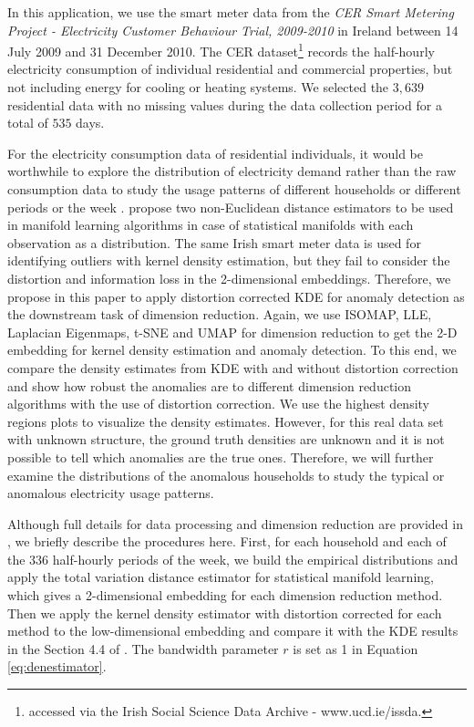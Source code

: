 \documentclass[11pt,a4paper,]{article}
\begin{document}
In this application, we use the smart meter data from the \emph{CER Smart Metering Project - Electricity Customer Behaviour Trial, 2009-2010} in Ireland \autocite{cer2012-data} between 14 July 2009 and 31 December 2010. The CER dataset\footnote{accessed via the Irish Social Science Data Archive - www.ucd.ie/issda.} records the half-hourly electricity consumption of individual residential and commercial properties, but not including energy for cooling or heating systems. We selected the \(3,639\) residential data with no missing values during the data collection period for a total of \(535\) days.

For the electricity consumption data of residential individuals, it would be worthwhile to explore the distribution of electricity demand rather than the raw consumption data to study the usage patterns of different households or different periods or the week \autocite{Hyndman2018-ia}.
\textcite{Cheng2021-dh} propose two non-Euclidean distance estimators to be used in manifold learning algorithms in case of statistical manifolds with each observation as a distribution. The same Irish smart meter data is used for identifying outliers with kernel density estimation, but they fail to consider the distortion and information loss in the 2-dimensional embeddings. Therefore, we propose in this paper to apply distortion corrected KDE for anomaly detection as the downstream task of dimension reduction. Again, we use ISOMAP, LLE, Laplacian Eigenmaps, t-SNE and UMAP for dimension reduction to get the 2-D embedding for kernel density estimation and anomaly detection. To this end, we compare the density estimates from KDE with and without distortion correction and show how robust the anomalies are to different dimension reduction algorithms with the use of distortion correction. We use the highest density regions plots to visualize the density estimates. However, for this real data set with unknown structure, the ground truth densities are unknown and it is not possible to tell which anomalies are the true ones. Therefore, we will further examine the distributions of the anomalous households to study the typical or anomalous electricity usage patterns.

Although full details for data processing and dimension reduction are provided in \textcite{Cheng2021-dh}, we briefly describe the procedures here. First, for each household and each of the \(336\) half-hourly periods of the week, we build the empirical distributions and apply the total variation distance estimator for statistical manifold learning, which gives a 2-dimensional embedding for each dimension reduction method. Then we apply the kernel density estimator with distortion corrected for each method to the low-dimensional embedding and compare it with the KDE results in the Section 4.4 of \textcite{Cheng2021-dh}. The bandwidth parameter \(r\) is set as 1 in Equation \eqref{eq:denestimator}.
\end{document}
